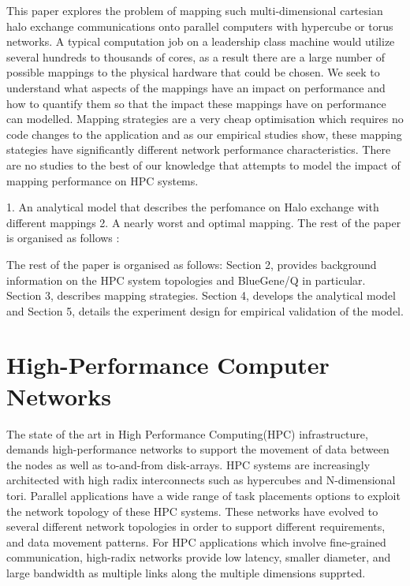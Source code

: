 \documentclass[conference,10pt]{IEEEtran}
\begin{document}
This paper explores the problem of mapping such multi-dimensional cartesian
halo exchange communications onto parallel computers with hypercube or
torus networks. A typical computation job on a leadership class machine would
utilize several hundreds to thousands of cores, as a result there are a large number of
possible mappings to the physical hardware that could be chosen. We seek to understand
what aspects of the mappings have an impact on performance and how to quantify them so
that the impact these mappings have on performance can modelled. Mapping strategies
are a very cheap optimisation which requires no code changes to the application
and as our empirical studies show, these mapping stategies have significantly
different network performance characteristics. There are no studies to the best
of our knowledge that attempts to model the impact of mapping performance on
HPC systems.

1. An analytical model that describes the perfomance on Halo exchange with different mappings
2. A nearly worst and optimal mapping.
The rest of the paper is organised as follows :

The rest of the paper is organised as follows: Section 2, provides background information on
the HPC system topologies and BlueGene/Q in particular. Section 3, describes mapping strategies.
Section 4, develops the analytical model and Section 5, details the experiment design for empirical
validation of the model.


\section{High-Performance Computer Networks}

The state of the art in High Performance Computing(HPC) infrastructure, demands high-performance networks
to support the movement of data between the nodes as well as to-and-from disk-arrays. HPC systems are
increasingly architected with high radix interconnects such as hypercubes and N-dimensional tori.
Parallel applications have a wide range of task placements options to exploit the network topology of
these HPC systems. These networks have evolved to several different network topologies in order to support
different requirements, and data movement patterns. For HPC applications which involve fine-grained communication,
high-radix networks provide low latency, smaller diameter, and large bandwidth as multiple links along the multiple
dimensions supprted.
\end{document}
